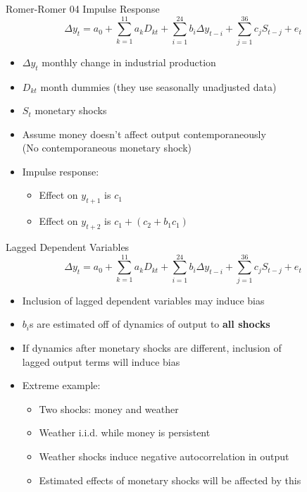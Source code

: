 \documentclass[11pt,aspectratio=169,xcolor={dvipsnames},hyperref={pdftex,pdfpagemode=UseNone,hidelinks,pdfdisplaydoctitle=true},usepdftitle=false]{beamer}
\begin{document}
\begin{frame}{Romer-Romer 04 Impulse Response}
\[ \Delta y_{t} = a_{0} + \sum_{k=1}^{11} a_{k} D_{kt} + \sum_{i=1}^{24} b_{i} \Delta y_{t-i} + \sum_{j=1}^{36} c_{j} S_{t-j} + e_{t} \]
\begin{itemize}
\item $\Delta y_{t}$ monthly change in industrial production
\item $D_{kt}$ month dummies (they use seasonally unadjusted data)
\item $S_{t}$ monetary shocks
\item Assume money doesn't affect output contemporaneously \\ (No contemporaneous monetary shock)
\item Impulse response: 
\begin{itemize}
\item Effect on $y_{t+1}$ is $c_{1}$
\item Effect on $y_{t+2}$ is $c_{1} + (c_{2} + b_{1}c_{1})$
\end{itemize}
\end{itemize}
\end{frame}


\begin{frame}{Lagged Dependent Variables}
\[ \Delta y_{t} = a_{0} + \sum_{k=1}^{11} a_{k} D_{kt} + \sum_{i=1}^{24} b_{i} \Delta y_{t-i} + \sum_{j=1}^{36} c_{j} S_{t-j} + e_{t} \]
\begin{itemize}
\item Inclusion of lagged dependent variables may induce bias
\item $b_{i}$s are estimated off of dynamics of output to \textbf{all shocks}
\item If dynamics after monetary shocks are different, inclusion of \\ lagged output terms will induce bias \pause
\item Extreme example:
\begin{itemize}
\item Two shocks: money and weather
\item Weather i.i.d. while money is persistent
\item Weather shocks induce negative autocorrelation in output
\item Estimated effects of monetary shocks will be affected by this
\end{itemize}
\end{itemize}
\end{frame}
\end{document}
